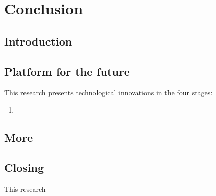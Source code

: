 \chapter*{Conclusion}\label{chap:CC}
\setcounter{chapter}{6}

\setcounter{section}{-1}
\section{Introduction}

\section{Platform for the future}

This research presents technological innovations in the four stages:
\begin{enumerate}
	\item 
\end{enumerate}

\section{More}


\section{Closing}
This research 



	